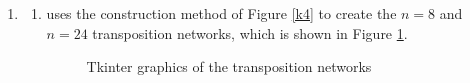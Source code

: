 \documentclass[12pt,a4paper]{article}
\makeatletter
\newtheorem*{solution}{Solution}
\theoremstyle{definition}
\renewenvironment{solution}[1][Solution] {\par\pushQED{\qed}\normalfont\topsep6\p@\@plus6\p@\relax\trivlist\item[\hskip\labelsep\bfseries#1\@addpunct{.}]\ignorespaces}{\popQED\endtrivlist\@endpefalse} \makeatother
\makeatother
\begin{document}
\begin{enumerate}
\begin{solution}
\begin{enumerate}
        \item {} uses the construction method of Figure \ref{k4} to create the $n=8$ and $n=24$ transposition networks, which is shown in Figure \ref{tkinter}.
        \begin{figure}[H]
            \centering
            \caption{Tkinter graphics of the transposition networks}
            \label{tkinter}
        \end{figure}

        \inputminted[highlightlines={47}]{Python}{code/Code-Transposition.py}
    \end{enumerate}
\end{solution}
\end{enumerate}

\end{document}
